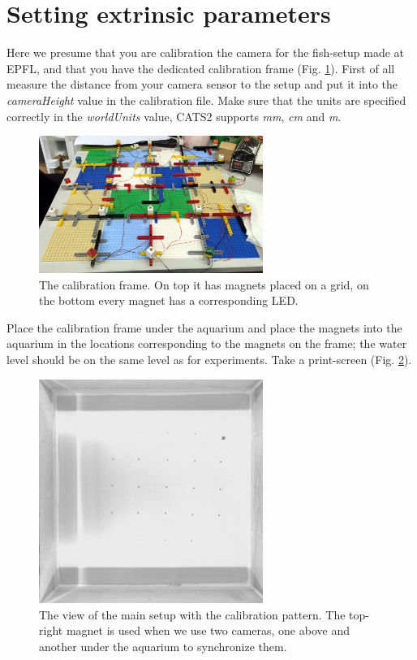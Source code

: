 \documentclass{styles/assisi}
\begin{document}
\section{Setting extrinsic parameters}
Here we presume that you are calibration the camera for the fish-setup made at EPFL, and that you have the dedicated calibration frame (Fig. \ref{fig:calibration-frame}). First of all measure the distance from your camera sensor to the setup and put it into the {\it cameraHeight} value in the calibration file. Make sure that the units are specified correctly in the {\it worldUnits} value, CATS2 supports {\it mm}, {\it cm} and {\it m}. 

\begin{figure}[h]
\centering
\includegraphics[width=0.65\textwidth]{./figs/calibration-frame}
\caption{The calibration frame. On top it has magnets placed on a grid, on the bottom every magnet has a corresponding LED.}
\label{fig:calibration-frame}
\end{figure}

Place the calibration frame under the aquarium and place the magnets into the aquarium in the locations corresponding to the magnets on the frame; the water level should be on the same level as for experiments. Take a print-screen (Fig. \ref{fig:main-setup}). 

\begin{figure}[h]
\centering
\includegraphics[width=0.65\textwidth]{./figs/cats2-main-camera}
\caption{The view of the main setup with the calibration pattern. The top-right magnet is used when we use two cameras, one above and another under the aquarium to synchronize them.}
\label{fig:main-setup}
\end{figure}
\end{document}

